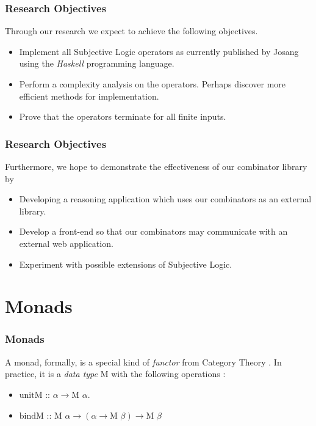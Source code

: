 \documentclass{beamer}
\begin{document}

\begin{frame}
\frametitle{Research Objectives}

Through our research we expect to achieve the following objectives.

\begin{itemize}
  \item Implement all Subjective Logic operators as currently published by Josang
    using the \emph{Haskell} programming language.
  \item Perform a complexity analysis on the operators. Perhaps discover more efficient
    methods for implementation.
  \item Prove that the operators terminate for all finite inputs.
\end{itemize}

\end{frame}


\begin{frame}
\frametitle{Research Objectives}

Furthermore, we hope to demonstrate the effectiveness of our combinator
library by

\begin{itemize}
  \item Developing a reasoning application which uses our combinators as an
    external library.
  \item Develop a front-end so that our combinators may communicate
    with an external web application.
  \item Experiment with possible extensions of Subjective Logic.
\end{itemize}

\end{frame}

%
%

\section{Monads}

\begin{frame}
\frametitle{Monads}

A monad, formally, is a special kind of \emph{functor} from Category Theory \cite{mac1998categories}. In
practice, it is a \emph{data type} M with the following operations \cite{Wadler:1992:EFP:143165.143169}:

\begin{itemize}
  \item $\mbox{unitM :: } \alpha \rightarrow \mbox{M } \alpha$.
  \item $\mbox{bindM :: } \mbox{M } \alpha \rightarrow \left(\alpha \rightarrow \mbox{M } \beta\right) \rightarrow \mbox{M } \beta$
\end{itemize}

\end{frame}
\end{document}
